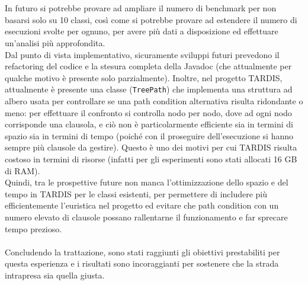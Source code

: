 \documentclass[a4paper, 12pt, oneside]{book}
\theoremstyle{normal}
\begin{document}
\\ \\ In futuro si potrebbe provare ad ampliare il numero di benchmark per non basarsi solo su 10 classi, così come si potrebbe provare ad estendere il numero di esecuzioni svolte per ognuno, per avere più dati a disposizione ed effettuare un'analisi più approfondita. \\ Dal punto di vista implementativo, sicuramente sviluppi futuri prevedono il refactoring del codice e la stesura completa della Javadoc (che attualmente per qualche motivo è presente solo parzialmente). Inoltre, nel progetto TARDIS, attualmente è presente una classe (\verb|TreePath|) che implementa una struttura ad albero usata per controllare se una path condition alternativa risulta ridondante o meno: per effettuare il confronto si controlla nodo per nodo, dove ad ogni nodo corrisponde una clausola, e ciò non è particolarmente efficiente sia in termini di spazio sia in termini di tempo (poiché con il proseguire dell'esecuzione si hanno sempre più clausole da gestire). Questo è uno dei motivi per cui TARDIS risulta costoso in termini di risorse (infatti per gli esperimenti sono stati allocati 16 GB di RAM). \\ Quindi, tra le prospettive future non manca l'ottimizzazione dello spazio e del tempo in TARDIS per le classi esistenti, per permettere di includere più efficientemente l'euristica nel progetto ed evitare che path condition con un numero elevato di clausole possano rallentarne il funzionamento e far sprecare tempo prezioso.
\\ \\ Concludendo la trattazione, sono stati raggiunti gli obiettivi prestabiliti per questa esperienza e i risultati sono incoraggianti per sostenere che la strada intrapresa sia quella giusta.

\clearpage

\printbibliography
\end{document}
